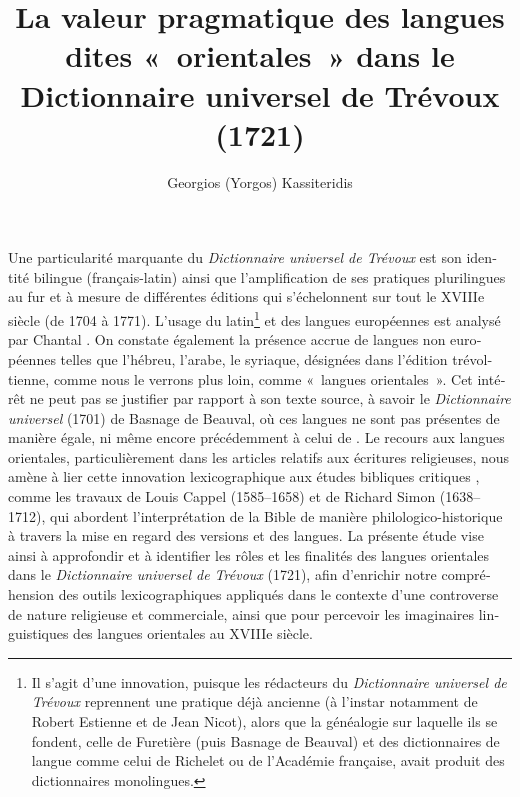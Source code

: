 \documentclass[output=paper,colorlinks,citecolor=brown,arabicfont,chinesefont,booklanguage=french]{langscibook}
\author{Georgios (Yorgos) Kassiteridis\affiliation{Centre Norbert Elias – Avignon Université}}
\title[Les langues orientales dans le \emph{Dictionnaire universel} de Trévoux]
      {La valeur pragmatique des langues dites «~orientales~» dans le Dictionnaire universel de Trévoux (1721)}
\begin{document}
 
\begin{otherlanguage}{french}
\maketitle

Une particularité marquante du \emph{Dictionnaire universel de Trévoux} est son identité bilingue (français-latin) ainsi que l'amplification de ses pratiques plurilingues au fur et à mesure de différentes éditions qui s’échelonnent sur tout le XVIIIe siècle (de 1704 à 1771). L’usage du latin\footnote{Il s’agit d’une innovation, puisque les rédacteurs du \emph{Dictionnaire universel de Trévoux} reprennent une pratique déjà ancienne (à l'instar notamment de Robert Estienne et de Jean Nicot), alors que la généalogie sur laquelle ils se fondent, celle de Furetière (puis Basnage de Beauval) et des dictionnaires de langue comme celui de Richelet ou de l'Académie française, avait produit des dictionnaires monolingues.} et des langues européennes est analysé par Chantal \citet{Wionet1998,Wionet2006}. On constate également la présence accrue de langues non européennes telles que l’hébreu, l’arabe, le syriaque, désignées dans l’édition trévoltienne, comme nous le verrons plus loin, comme «~langues orientales~». Cet intérêt ne peut pas se justifier par rapport à son texte source, à savoir le \emph{Dictionnaire universel} (1701) de Basnage de Beauval, où ces langues ne sont pas présentes de manière égale, ni même encore précédemment à celui de \citet{Furetière1690}. Le recours aux langues orientales, particulièrement dans les articles relatifs aux écritures religieuses, nous amène à lier cette innovation lexicographique aux études bibliques critiques \citep{Laplanche1994}, comme les travaux de Louis Cappel (1585--1658) et de Richard Simon (1638--1712), qui abordent l'interprétation de la Bible de manière philologico-historique à travers la mise en regard des versions et des langues. La présente étude vise ainsi à approfondir et à identifier les rôles et les finalités des langues orientales dans le \emph{Dictionnaire universel de Trévoux} (1721), afin d’enrichir notre compréhension des outils lexicographiques appliqués dans le contexte d’une controverse de nature religieuse et commerciale, ainsi que pour percevoir les imaginaires linguistiques des langues orientales au XVIIIe siècle.


\end{otherlanguage}
\end{document}

